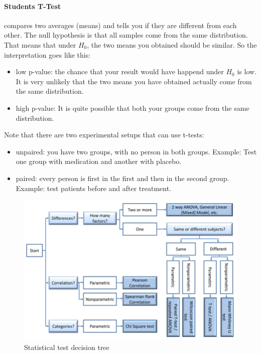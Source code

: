 \paragraph{Students T-Test} compares two averages (means) and tells you if they are different from each other. The null hypothesis is that all samples come from the same distribution. That means that under $H_0$, the two means you obtained should be similar. So the interpretation goes like this: 
\begin{itemize}
    \item low p-value: the chance that your result would have happend under $H_0$ is low. It is very unlikely that the two means you have obtained actually come from the same distribution. 
    \item high p-value: It is quite possible that both your groups come from the same distribution. 
\end{itemize}
Note that there are two experimental setups that can use t-tests:
\begin{itemize}
    \item unpaired: you have two groups, with no person in both groups. Example: Test one group with medication and another with placebo. 
    \item paired: every person is first in the first and then in the second group. Example: test patients before and after treatment. 
\end{itemize}

\begin{figure}[H]
    \caption{Statistical test decision tree}
    \centering
    \includegraphics[width=0.7\linewidth]{images/statistical_test_decision_tree.png}
\end{figure}

